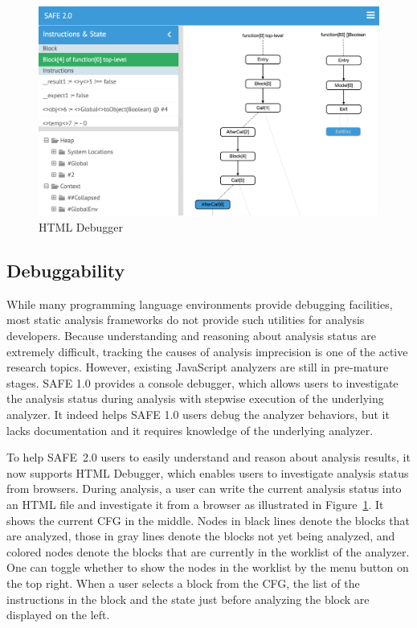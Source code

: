 \documentclass[10pt, conference]{IEEEtran}
\newcommand{\oldsafe}{{SAFE 1.0}\xspace}
\newcommand{\safe}{{SAFE~2.0}\xspace}
\newcommand{\htmldebug}{{\sf\small HTML Debugger}\xspace}
\begin{document}
\begin{figure}[t]
\centering
\includegraphics[width=.68\textwidth]{htmldebugger.png}
\caption{\htmldebug}\label{fig:htmldebug}
\end{figure}

\subsection{Debuggability}
While many programming language environments provide debugging
facilities, most static analysis frameworks do not provide such utilities
for analysis developers.  Because understanding and reasoning about
analysis status are extremely difficult, tracking the causes of analysis
imprecision is one of the active research topics.  However, existing
JavaScript analyzers are still in pre-mature stages.  \oldsafe provides
a console debugger, which allows users to investigate the analysis status
during analysis with stepwise execution of the underlying analyzer.
It indeed helps \oldsafe users debug the analyzer behaviors, but it lacks
documentation and it requires knowledge of the underlying analyzer.


To help \safe users to easily understand and reason about
analysis results, it now supports \htmldebug, which enables users
to investigate analysis status from browsers.  During analysis,
a user can write the current analysis status into an HTML file and
investigate it from a browser as illustrated in
Figure~\ref{fig:htmldebug}.  It shows the current CFG in the middle.
Nodes in black lines denote the blocks that are analyzed, those in
gray lines denote the blocks not yet being analyzed, and colored nodes
denote the blocks that are currently in the worklist of the analyzer.
One can toggle whether to show the nodes in the worklist by the menu
button on the top right.
When a user selects a block from the CFG, the list of the instructions in
the block and the state just before analyzing the block are displayed
on the left.
\end{document}
